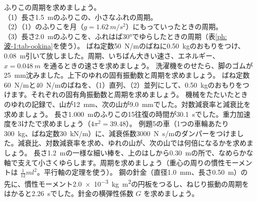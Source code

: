 \bkendproblems
{}
\bkproblem ふりこの周期を求めましょう。\\
（1）長さ\qty{1.5}{m}のふりこの、小さなふれの周期。\\
（2）（1）のふりこを月（$g=\qty{1.62}{m/s^2}$）にもっていったときの周期。\\
（3）長さ\qty{2.0}{m}のふりこを、ふれはば30°でゆらしたときの周期（表\ref{ph:波-1:tab-ookina}を使う）。
\bkproblem ばね定数\qty{50}{N/m}のばねに\qty{0.50}{kg}のおもりをつけ、\qty{0.08}{m}引いて放しました。周期、いちばん大きい速さ、エネルギー、$x=\qty{0.048}{m}$ を通るときの速さを求めましょう。
\bkproblem 洗濯機をのせたら、脚のゴムが\qty{25}{mm}沈みました。上下のゆれの固有振動数と周期を求めましょう。
\bkproblem ばね定数\qty{60}{N/m}と\qty{40}{N/m}のばねを、（1）直列、（2）並列にして、\qty{0.50}{kg}のおもりをつけます。それぞれの固有角振動数と周期を求めましょう。
\bkproblem 機械をたたいたときのゆれの記録で、山が\qty{12}{mm}、次の山が\qty{9.0}{mm}でした。対数減衰率と減衰比を求めましょう。
\bkproblem 長さ\qty{1.000}{m}のふりこの15往復の時間が\qty{30.1}{s}でした。重力加速度を3けたで求めましょう（$4\pi^2=39.48$）。
\bkproblem 例題5の車（1つの車輪あたり\qty{300}{kg}、ばね定数\qty{30}{kN/m}）に、減衰係数\qty{3000}{N.s/m}のダンパーをつけました。減衰比、対数減衰率を求め、ゆれの山が、次の山では何倍になるかを求めましょう。
\bkproblem 長さ\qty{1.2}{m}の一様な細い棒を、上のはしから\qty{0.30}{m}の所で、なめらかな軸で支えて小さくゆらします。周期を求めましょう（重心の周りの慣性モーメントは $\tfrac{1}{12}ml^2$。平行軸の定理を使う）。
\bkproblem 鋼の針金（直径\qty{1.0}{mm}、長さ\qty{0.50}{m}）の先に、慣性モーメント\qty{2.0e-3}{kg.m^2}の円板をつるし、ねじり振動の周期をはかると\qty{2.26}{s}でした。針金の横弾性係数 $G$ を求めましょう。

